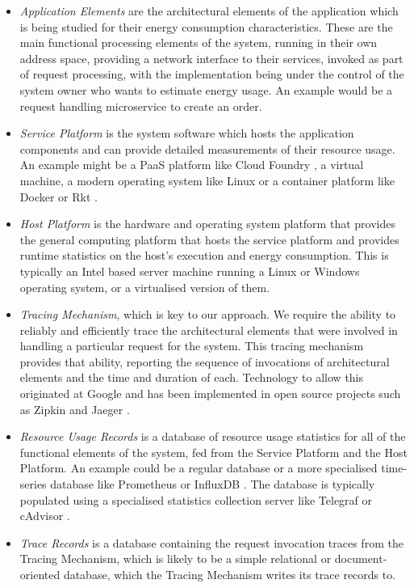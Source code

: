 \begin{itemize}
\item \emph{Application Elements} are the architectural elements of the application which is being studied for their energy consumption characteristics.  These are the main functional processing elements of the system, running in their own address space, providing a network interface to their services, invoked as part of request processing, with the implementation being under the control of the system owner who wants to estimate energy usage.  An example would be a request handling microservice to create an order.
\item \emph{Service Platform} is the system software which hosts the application components and can provide detailed measurements of their resource usage.  An example might be a PaaS platform like Cloud Foundry \cite{cloudfoundry2018}, a virtual machine, a modern operating system like Linux or a container platform like Docker \cite{docker2018} or Rkt \cite{rkt2018}.
\item \emph{Host Platform} is the hardware and operating system platform that provides the general computing platform that hosts the service platform and provides runtime statistics on the host's execution and energy consumption.  This is typically an Intel based server machine running a Linux or Windows operating system, or a virtualised version of them.
\item \emph{Tracing Mechanism}, which is key to our approach.  We require the ability to reliably and efficiently trace the architectural elements that were involved in handling a particular request for the system.  This tracing mechanism provides that ability, reporting the sequence of invocations of architectural elements and the time and duration of each.  Technology to allow this originated at Google \cite{sigelman2010-dapper} and has been implemented in open source projects such as Zipkin \cite{zipkin2018} and Jaeger \cite{jaeger2018}.
\item \emph{Resource Usage Records} is a database of resource usage statistics for all of the functional elements of the system, fed from the Service Platform and the Host Platform.  An example could be a regular database or a more specialised time-series database like Prometheus \cite{prometheus2018} or InfluxDB \cite{influxdb2018}.  The database is typically populated using a specialised statistics collection server like Telegraf \cite{telegraf2018} or cAdvisor \cite{cadvisor2018}.
\item \emph{Trace Records} is a database containing the request invocation traces from the Tracing Mechanism, which is likely to be a simple relational or document-oriented database, which the Tracing Mechanism writes its trace records to.

\end{itemize}
